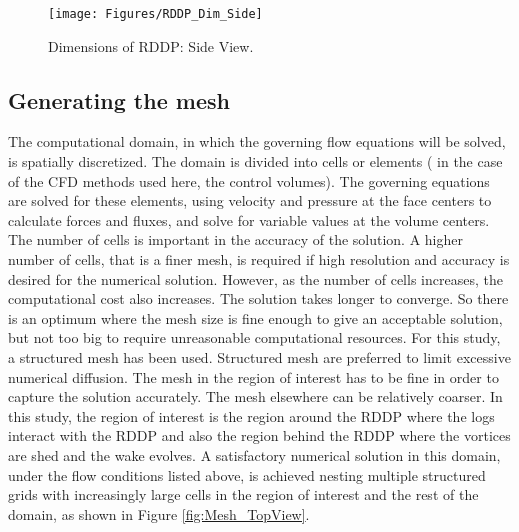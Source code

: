 \begin{figure}
\centering
\texttt{[image: Figures/RDDP\_Dim\_Side]}
\caption{\label{fig:RDDP_Dim_Side}Dimensions of RDDP: Side View.}
\end{figure}

\subsection*{Generating the mesh}
The computational domain, in which the governing flow equations will be solved, is spatially discretized. The domain is divided into cells or elements ( in the case of the CFD methods used here, the control volumes). The governing equations are solved for these elements, using velocity and pressure at the face centers to calculate forces and fluxes, and solve for variable values at the volume centers.\\
The number of cells is important in the accuracy of the solution. A higher number of cells, that is a finer mesh, is required if high resolution and accuracy is desired for the numerical solution. However, as the number of cells increases, the computational cost also increases. The solution takes longer to converge. So there is an optimum where the mesh size is fine enough to give an acceptable solution, but not too big to require unreasonable computational resources.
For this study, a structured mesh has been used. Structured mesh are preferred to limit excessive numerical diffusion. The mesh in the region of interest has to be fine in order to capture the solution accurately. The mesh elsewhere can be relatively coarser. In this study, the region of interest is the region around the RDDP where the logs interact with the RDDP and also the region behind the RDDP where the vortices are shed and the wake evolves. A satisfactory numerical solution in this domain, under the flow conditions listed above, is achieved nesting multiple structured grids with increasingly large cells in the region of interest and the rest of the domain, as shown in Figure \ref{fig:Mesh_TopView}.\\

